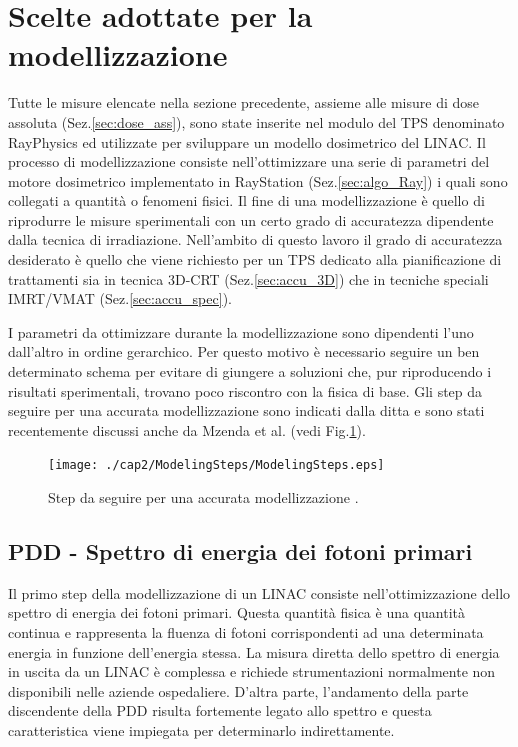 \section{Scelte adottate per la modellizzazione}
Tutte le misure elencate nella sezione precedente, assieme alle misure di dose assoluta (Sez.\ref{sec:dose_ass}), sono state inserite nel modulo del TPS denominato RayPhysics ed utilizzate per sviluppare un modello dosimetrico del LINAC. Il processo di modellizzazione consiste nell'ottimizzare una serie di parametri del motore dosimetrico implementato in RayStation (Sez.\ref{sec:algo_Ray}) i quali sono collegati a quantità o fenomeni fisici. Il fine di una modellizzazione è quello di riprodurre le misure sperimentali con un certo grado di accuratezza dipendente dalla tecnica di irradiazione. Nell'ambito di questo lavoro il grado di accuratezza desiderato è quello che viene richiesto per un TPS dedicato alla pianificazione di trattamenti sia in tecnica 3D-CRT (Sez.\ref{sec:accu_3D}) che in tecniche speciali IMRT/VMAT (Sez.\ref{sec:accu_spec}).

I parametri da ottimizzare durante la modellizzazione sono dipendenti l'uno dall'altro in ordine gerarchico. Per questo motivo è necessario seguire un ben determinato schema per evitare di giungere a soluzioni che, pur riproducendo i risultati sperimentali, trovano poco riscontro con la fisica di base. Gli step da seguire per una accurata modellizzazione sono indicati dalla ditta \cite{RaySearchLaboratories2014} e sono stati recentemente discussi anche da Mzenda et al.\cite{Mzenda2014} (vedi Fig.\ref{fig:modeling_steps}).
\begin{figure}
\centering
\texttt{[image: ./cap2/ModelingSteps/ModelingSteps.eps]}
\caption{Step da seguire per una accurata modellizzazione \cite{Mzenda2014}.}
\label{fig:modeling_steps}
\end{figure}

\subsection{PDD - Spettro di energia dei fotoni primari}
Il primo step della modellizzazione di un LINAC consiste nell'ottimizzazione dello spettro di energia dei fotoni primari. Questa quantità fisica è una quantità continua e rappresenta la fluenza di fotoni corrispondenti ad una determinata energia in funzione dell'energia stessa. La misura diretta dello spettro di energia in uscita da un LINAC è complessa e richiede strumentazioni normalmente non disponibili nelle aziende ospedaliere. D'altra parte, l'andamento della parte discendente della PDD risulta fortemente legato allo spettro \cite{Khan2010} e questa caratteristica viene impiegata per determinarlo indirettamente.

